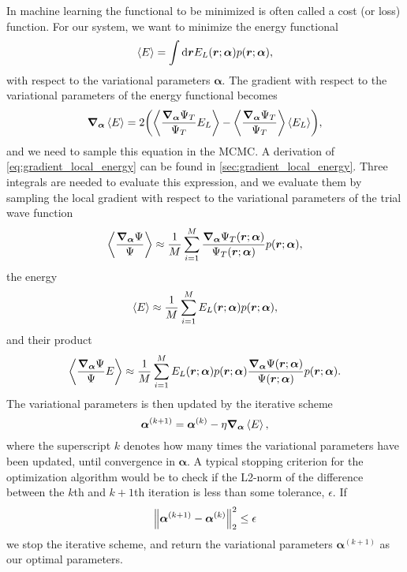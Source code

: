 In machine learning the functional to be minimized is often called a cost (or loss) function. For our system, we want to minimize the energy functional
\begin{equation}
    \expval{E} = \int\mathrm{d}\bm{r}E_L(\bm{r};\bm{\alpha})p(\bm{r};\bm{\alpha}),  
\end{equation}
with respect to the variational parameters $\bm{\alpha}$. The gradient with respect to the variational parameters of the energy functional becomes
\begin{equation}\label{eq:gradient_local_energy}
    \grad_{\bm{\alpha}}\expval{E} = 2\qty(\expval{\frac{\grad_{\mathrm{\bm{\alpha}}}\Psi_T}{\Psi_T}E_L} - \expval{\frac{\grad_{\mathrm{\bm{\alpha}}}\Psi_T}{\Psi_T}}\expval{E_L}), 
\end{equation}
and we need to sample this equation in the MCMC. A derivation of \autoref{eq:gradient_local_energy} can be found in \autoref{sec:gradient_local_energy}. Three integrals are needed to evaluate this expression, and we evaluate them by sampling the local gradient with respect to the variational parameters of the trial wave function 
\begin{equation}
    \expval{\frac{\grad_{\bm{\alpha}}\Psi}{\Psi}} \approx \frac{1}{M}\sum_{i=1}^M\frac{\grad_{\bm{\alpha}}\Psi_T(\bm{r};\bm{\alpha})}{\Psi_T(\bm{r};\bm{\alpha})}p(\bm{r};\bm{\alpha}), 
\end{equation}
the energy
\begin{equation}
    \expval{E} \approx \frac{1}{M}\sum_{i=1}^ME_L(\bm{r};\bm{\alpha})p(\bm{r};\bm{\alpha}), 
\end{equation}
and their product
\begin{equation}
    \expval{\frac{\grad_{\bm{\alpha}}\Psi}{\Psi}E} \approx \frac{1}{M}\sum_{i=1}^M E_L(\bm{r};\bm{\alpha})p(\bm{r};\bm{\alpha})\frac{\grad_{\bm{\alpha}}\Psi(\bm{r};\bm{\alpha})}{\Psi(\bm{r};\bm{\alpha})}p(\bm{r};\bm{\alpha}).
\end{equation}
The variational parameters is then updated by the iterative scheme 
\begin{equation}
    \bm{\alpha}^{(k+1)} = \bm{\alpha}^{(k)} - \eta\grad_{\bm{\alpha}}\expval{E}, 
\end{equation}
where the superscript $k$ denotes how many times the variational parameters have been updated, until convergence in $\bm{\alpha}$. A typical stopping criterion for the optimization algorithm would be to check if the L2-norm of the difference between the $k$th and $k+1$th iteration is less than some tolerance, $\epsilon$. If
\begin{equation}
    \norm{\bm{\alpha}^{(k+1)}-\bm{\alpha}^{(k)}}_2^2 \leq \epsilon 
\end{equation}
we stop the iterative scheme, and return the variational parameters $\bm{\alpha}^{(k+1)}$ as our optimal parameters.

